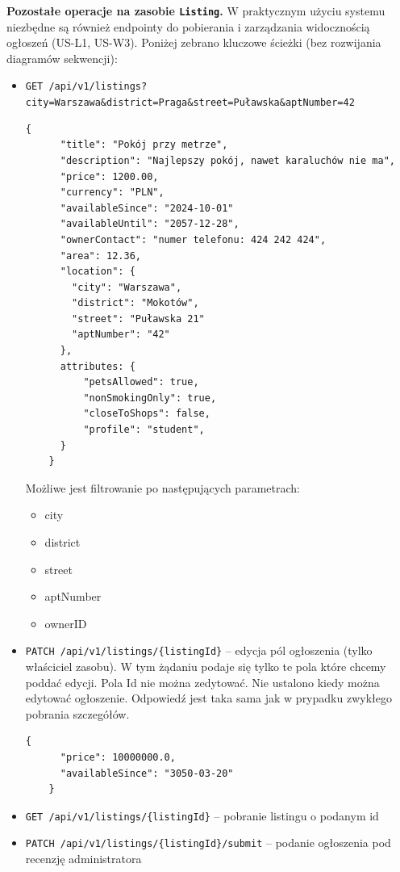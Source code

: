 \documentclass[11pt, a4paper]{article}
\begin{document}
\noindent\textbf{Pozostałe operacje na zasobie \texttt{Listing}.} W praktycznym użyciu systemu niezbędne są również endpointy do pobierania i zarządzania widocznością ogłoszeń (US-L1, US-W3). Poniżej zebrano kluczowe ścieżki (bez rozwijania diagramów sekwencji):
\begin{itemize}
    \item \texttt{GET /api/v1/listings?city=Warszawa\&district=Praga\&street=Puławska\&aptNumber=42}
    \begin{lstlisting}[style=json,caption={Odpowiedź żądania}]
    {
      "title": "Pokój przy metrze",
      "description": "Najlepszy pokój, nawet karaluchów nie ma",
      "price": 1200.00,
      "currency": "PLN",
      "availableSince": "2024-10-01"
      "availableUntil": "2057-12-28",
      "ownerContact": "numer telefonu: 424 242 424",
      "area": 12.36,
      "location": {
        "city": "Warszawa",
        "district": "Mokotów",
        "street": "Puławska 21"
        "aptNumber": "42"
      },
      attributes: {
          "petsAllowed": true,
          "nonSmokingOnly": true,
          "closeToShops": false,
          "profile": "student",
      }
    }
    \end{lstlisting}
    Możliwe jest filtrowanie po następujących parametrach:
    \begin{itemize}
        \item city
        \item district
        \item street
        \item aptNumber
        \item ownerID
    \end{itemize}
    \item \texttt{PATCH /api/v1/listings/\{listingId\}} -- edycja pól ogłoszenia (tylko właściciel zasobu). W tym żądaniu podaje się tylko te pola które chcemy poddać edycji. Pola Id nie można zedytować. Nie ustalono kiedy można edytować ogłoszenie. Odpowiedź jest taka sama jak w prypadku zwykłego pobrania szczegółów.
    \begin{lstlisting}[style=json,caption={Żądanie edycji ogłoszenia}]
    {
      "price": 10000000.0,
      "availableSince": "3050-03-20"
    }
    \end{lstlisting}

    \item \texttt{GET /api/v1/listings/\{listingId\}} -- pobranie listingu o podanym id

    \item \texttt{PATCH /api/v1/listings/\{listingId\}/submit} -- podanie ogłoszenia pod recenzję administratora


\end{itemize}
\end{document}
